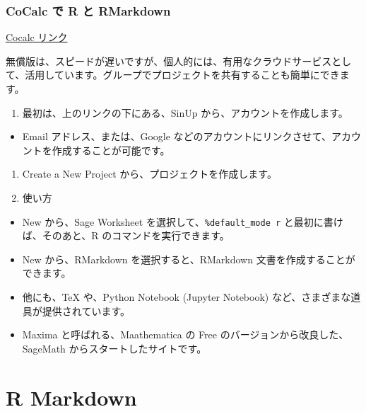 \documentclass[
]{bxjsbook}
\providecommand{\tightlist}{%
  \setlength{\itemsep}{0pt}\setlength{\parskip}{0pt}}
\theoremstyle{definition}
\theoremstyle{definition}
\theoremstyle{definition}
\theoremstyle{definition}
\theoremstyle{remark}
\begin{document}
\hypertarget{cocalc-ux3067-r-ux3068-rmarkdown}{%
\subsubsection{CoCalc で R と RMarkdown}\label{cocalc-ux3067-r-ux3068-rmarkdown}}

\href{https://cocalc.com}{Cocalc リンク}

無償版は、スピードが遅いですが、個人的には、有用なクラウドサービスとして、活用しています。グループでプロジェクトを共有することも簡単にできます。

\begin{enumerate}
\def\labelenumi{\arabic{enumi}.}
\tightlist
\item
  最初は、上のリンクの下にある、SinUp から、アカウントを作成します。
\end{enumerate}

\begin{itemize}
\tightlist
\item
  Email アドレス、または、Google などのアカウントにリンクさせて、アカウントを作成することが可能です。
\end{itemize}

\begin{enumerate}
\def\labelenumi{\arabic{enumi}.}
\setcounter{enumi}{1}
\tightlist
\item
  Create a New Project から、プロジェクトを作成します。
\item
  使い方
\end{enumerate}

\begin{itemize}
\tightlist
\item
  New から、Sage Worksheet を選択して、\texttt{\%default\_mode\ r} と最初に書けば、そのあと、R のコマンドを実行できます。
\item
  New から、RMarkdown を選択すると、RMarkdown 文書を作成することができます。
\item
  他にも、TeX や、Python Notebook (Jupyter Notebook) など、さまざまな道具が提供されています。
\item
  Maxima と呼ばれる、Maathematica の Free のバージョンから改良した、SageMath からスタートしたサイトです。
\end{itemize}

\hypertarget{rmarkdown}{%
\section{R Markdown}\label{rmarkdown}}
\end{document}
